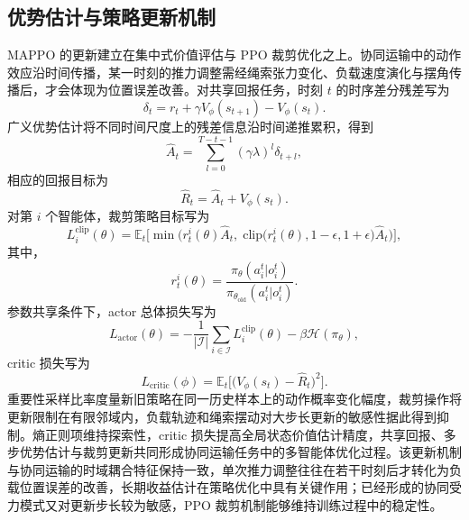 \subsection{优势估计与策略更新机制}

MAPPO 的更新建立在集中式价值评估与 PPO 裁剪优化之上。协同运输中的动作效应沿时间传播，某一时刻的推力调整需经绳索张力变化、负载速度演化与摆角传播后，才会体现为位置误差改善。对共享回报任务，时刻 $t$ 的时序差分残差写为
\begin{equation}
    \delta_t = r_t + \gamma V_{\phi}(s_{t+1}) - V_{\phi}(s_t).
\end{equation}
广义优势估计将不同时间尺度上的残差信息沿时间递推累积，得到
\begin{equation}
    \hat A_t = \sum_{l=0}^{T-t-1}(\gamma\lambda)^l\delta_{t+l},
\end{equation}
相应的回报目标为
\begin{equation}
    \hat R_t = \hat A_t + V_{\phi}(s_t).
\end{equation}
对第 $i$ 个智能体，裁剪策略目标写为
\begin{equation}
    L_i^{\mathrm{clip}}(\theta)
    =
    \mathbb E_t
    \Big[
    \min\Big(
    r_t^i(\theta)\hat A_t,\;
    \mathrm{clip}\big(r_t^i(\theta),1-\epsilon,1+\epsilon\big)\hat A_t
    \Big)
    \Big],
\end{equation}
其中，
\begin{equation}
    r_t^i(\theta)
    =
    \frac{\pi_{\theta}(a_i^t|o_i^t)}
    {\pi_{\theta_{\mathrm{old}}}(a_i^t|o_i^t)}.
\end{equation}
参数共享条件下，actor 总体损失写为
\begin{equation}
    L_{\mathrm{actor}}(\theta)
    =
    -\frac{1}{|\mathcal I|}
    \sum_{i\in\mathcal I}L_i^{\mathrm{clip}}(\theta)
    -\beta \mathcal H(\pi_{\theta}),
\end{equation}
critic 损失写为
\begin{equation}
    L_{\mathrm{critic}}(\phi)
    =
    \mathbb E_t\Big[
    \big(V_{\phi}(s_t)-\hat R_t\big)^2
    \Big].
\end{equation}
重要性采样比率度量新旧策略在同一历史样本上的动作概率变化幅度，裁剪操作将更新限制在有限邻域内，负载轨迹和绳索摆动对大步长更新的敏感性据此得到抑制。熵正则项维持探索性，critic 损失提高全局状态价值估计精度，共享回报、多步优势估计与裁剪更新共同形成协同运输任务中的多智能体优化过程。该更新机制与协同运输的时域耦合特征保持一致，单次推力调整往往在若干时刻后才转化为负载位置误差的改善，长期收益估计在策略优化中具有关键作用；已经形成的协同受力模式又对更新步长较为敏感，PPO 裁剪机制能够维持训练过程中的稳定性。

